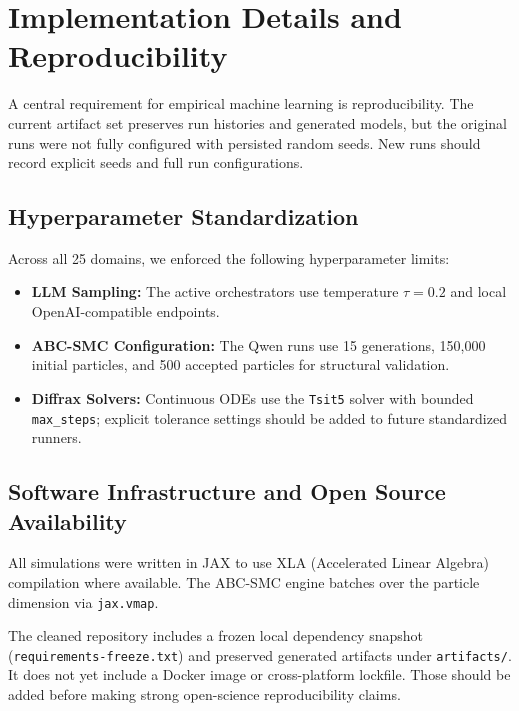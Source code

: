 \section{Implementation Details and Reproducibility}
\label{sec:reproducibility}

A central requirement for empirical machine learning is reproducibility. The current artifact set preserves run histories and generated models, but the original runs were not fully configured with persisted random seeds. New runs should record explicit seeds and full run configurations.

\subsection{Hyperparameter Standardization}
Across all 25 domains, we enforced the following hyperparameter limits:
\begin{itemize}
    \item \textbf{LLM Sampling:} The active orchestrators use temperature $\tau = 0.2$ and local OpenAI-compatible endpoints.
    \item \textbf{ABC-SMC Configuration:} The Qwen runs use 15 generations, 150,000 initial particles, and 500 accepted particles for structural validation.
    \item \textbf{Diffrax Solvers:} Continuous ODEs use the \texttt{Tsit5} solver with bounded \texttt{max\_steps}; explicit tolerance settings should be added to future standardized runners.
\end{itemize}

\subsection{Software Infrastructure and Open Source Availability}
All simulations were written in JAX to use XLA (Accelerated Linear Algebra) compilation where available. The ABC-SMC engine batches over the particle dimension via \texttt{jax.vmap}.

The cleaned repository includes a frozen local dependency snapshot (\texttt{requirements-freeze.txt}) and preserved generated artifacts under \texttt{artifacts/}. It does not yet include a Docker image or cross-platform lockfile. Those should be added before making strong open-science reproducibility claims.
